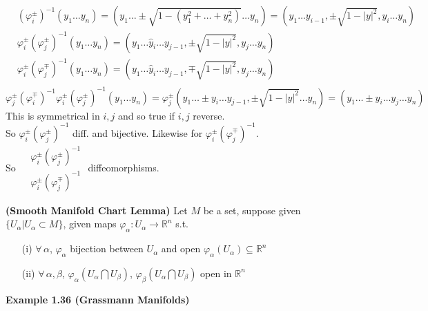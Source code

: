 \[
\begin{aligned}
  & (\varphi_i^{\pm})^{-1}(y_1 \dots y_n) = (y_1 \dots \pm \sqrt{ 1 - (y_1^2 + \dots + y_n^2) } \dots y_n) = (y_1 \dots y_{i-1}, \pm \sqrt{ 1-  |y|^2 }, y_i\dots y_n ) \\ 
 & \varphi_i^{\pm} (\varphi_j^{\pm})^{-1}(y_1 \dots y_n ) = (y_1 \dots \widehat{y}_i \dots y_{j-1} , \pm \sqrt{ 1 - |y|^2 }, y_j \dots y_n) \\ 
 & \varphi_i^{\pm} (\varphi_j^{\mp})^{-1}(y_1 \dots y_n ) = (y_1 \dots \widehat{y}_i \dots y_{j-1} , \mp \sqrt{ 1 - |y|^2 }, y_j \dots y_n) \\ 
\end{aligned}
\]
\[
\varphi_j^{\pm}(\varphi_i^{\mp})^{-1} \varphi_i^{\pm} (\varphi_j^{\pm})^{-1}(y_1 \dots y_n) = \varphi_j^{\pm}(y_1 \dots \pm y_i \dots y_{j-1}, \pm \sqrt{ 1 - |y|^2 } \dots y_n ) = (y_1 \dots \pm y_i \dots y_j \dots y_n)
\]
This is symmetrical in $i,j$ and so true if $i,j$ reverse.  \\

So $\varphi_i^{\pm}(\varphi_j^{\pm})^{-1}$ diff. and bijective.  Likewise for $\varphi_i^{\pm}(\varphi_j^{\mp})^{-1}$.  \\
So $\begin{aligned} & \varphi_i^{\pm} (\varphi_j^{\pm})^{-1} \\ 
  & \varphi_i^{\pm} (\varphi_j^{\mp})^{-1} \end{aligned}$ diffeomorphisms.  

\begin{lemma}[1.35] \textbf{(Smooth Manifold Chart Lemma)}
Let $M$ be a set, suppose given $\lbrace U_{\alpha} | U_{\alpha} \subset M \rbrace$, given maps $\varphi_{\alpha}: U_{\alpha} \to \mathbb{R}^n$ s.t.
\begin{enumerate}
\item[(i)] $\forall \, \alpha$, $\varphi_{\alpha}$ bijection between $U_{\alpha}$ and open $\varphi_{\alpha}(U_{\alpha}) \subseteq \mathbb{R}^n$
\item[(ii)] $\forall \, \alpha, \beta$, $\varphi_{\alpha}(U_{\alpha} \bigcap U_{\beta})$, $\varphi_{\beta}(U_{\alpha} \bigcap U_{\beta})$ open in $\mathbb{R}^n$
\end{enumerate}
\end{lemma}


\textbf{Example 1.36 (Grassmann Manifolds)}



